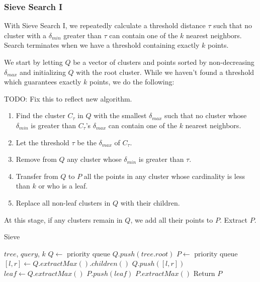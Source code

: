 \subsubsection{Sieve Search I}
\label{subsubsec:methods:knn-search:sieve}
With Sieve Search I, we repeatedly calculate a threshold distance $\tau$ such that no cluster with a $\delta_{min}$ greater than $\tau$ 
can contain one of the $k$ nearest neighbors. Search terminates when we have a threshold containing exactly $k$ points.

We start by letting $Q$ be a vector of clusters and points sorted by non-decreasing $\delta_{max}$ and initializing $Q$ with the root cluster. 
While we haven't found a threshold which guarantees exactly $k$ points, we do the following: 



TODO: Fix this to reflect new algorithm.

\begin{enumerate}
\item Find the cluster $C_{\tau}$ in $Q$ with the smallest $\delta_{max}$ such that no cluster whose $\delta_{min}$ is greater than $C_{\tau}$'s $\delta_{max}$ can contain one of the $k$ nearest neighbors.
\item Let the threshold $\tau$ be the $\delta_{max}$ of $C_{\tau}$.
\item Remove from $Q$ any cluster whose $\delta_{min}$ is greater than $\tau$.
\item Transfer from $Q$ to $P$ all the points in any cluster whose cardinality is less than $k$ or who is a leaf. 
\item Replace all non-leaf clusters in $Q$ with their children. 
\end{enumerate}

At this stage, if any clusters remain in $Q$, we add all their points to $P$. 
Extract $P$. 

\begin{algorithm} %
    \caption{Sieve } %
    \label{alg:sieve_v1} %
    \begin{algorithmic}[2] %
        \REQUIRE $tree$, $query$, $k$
        \STATE $Q \leftarrow$ priority queue
        \STATE $Q.push(tree.root)$
        \STATE $P \leftarrow$ priority queue
                \STATE $[l, r] \leftarrow Q.extractMax().children()$
                \STATE $Q.push([l, r])$
            \ENDWHILE
            \STATE $leaf \leftarrow Q.extractMax()$
            \STATE $P.push(leaf)$
                \STATE $P.extractMax()$
            \ENDWHILE
        \ENDWHILE
        \STATE Return $P$
    \end{algorithmic}
    \end{algorithm}


